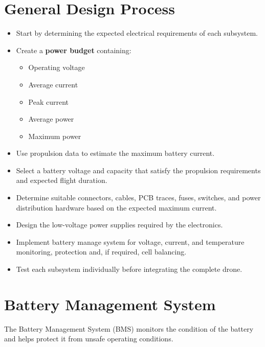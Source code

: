 \documentclass{article}
\begin{document}
\section{General Design Process}

\begin{itemize}

\item Start by determining the expected electrical requirements of each subsystem.

\item Create a \textbf{power budget} containing:
\begin{itemize}
    \item Operating voltage
    \item Average current
    \item Peak current
    \item Average power
    \item Maximum power
\end{itemize}

\item Use propulsion data to estimate the maximum battery current.

\item Select a battery voltage and capacity that satisfy the propulsion requirements and expected flight duration.

\item Determine suitable connectors, cables, PCB traces, fuses, switches, and power distribution hardware based on the expected maximum current.

\item Design the low-voltage power supplies required by the electronics.

\item Implement battery manage system for voltage, current, and temperature monitoring, protection and, if required, cell balancing.

\item Test each subsystem individually before integrating the complete drone.

\end{itemize}

\section{Battery Management System}

The Battery Management System (BMS) monitors the condition of the battery and helps protect it from unsafe operating conditions.
\end{document}
